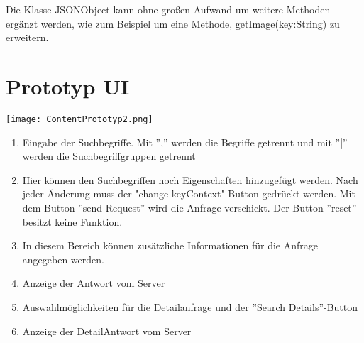 Die Klasse JSONObject kann ohne großen Aufwand um weitere Methoden ergänzt werden, wie zum Beispiel um eine Methode, getImage(key:String) zu erweitern.

\section{Prototyp UI}
\texttt{[image: ContentPrototyp2.png]}
\begin{enumerate}
\item Eingabe der Suchbegriffe. Mit '','' werden die Begriffe getrennt und mit ''|'' werden die Suchbegriffgruppen getrennt
\item Hier können den Suchbegriffen noch Eigenschaften hinzugefügt werden. Nach jeder Änderung muss der "change keyContext"-Button gedrückt werden. Mit dem Button ''send Request'' wird die Anfrage verschickt. Der Button ''reset'' besitzt keine Funktion.
\item In diesem Bereich können zusätzliche Informationen für die Anfrage angegeben werden.
\item Anzeige der Antwort vom Server
\item Auswahlmöglichkeiten für die Detailanfrage und der ''Search Details''-Button
\item Anzeige der DetailAntwort vom Server
\end{enumerate}

